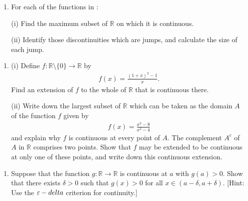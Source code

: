 \documentclass[letterpaper,10pt,english]{jupyterBook}
\begin{document}
\label{\detokenize{Problems:id17}}\begin{enumerate}
%
\setcounter{enumi}{16}
\item {} 
\sphinxAtStartPar
For each of the functions in {\hyperref[\detokenize{Problems:id7}]{}}:

\sphinxAtStartPar
(i) Find the maximum subset of \(\mathbb{R}\) on which it is continuous.

\sphinxAtStartPar
(ii) Identify those discontinuities which are jumps, and calculate the size of each jump.

\end{enumerate}
\label{\detokenize{Problems:id18}}\begin{enumerate}
%
\setcounter{enumi}{17}
\item {} 
\sphinxAtStartPar
(i) Define \(f:\mathbb{R} \setminus \{0\} \rightarrow \mathbb{R}\) by
\begin{equation*}
\begin{split}
    f(x) = \displaystyle\frac{(1 + x)^{2} - 1}{x}.
    \end{split}
\end{equation*}
\sphinxAtStartPar
Find an extension of \(f\) to the whole of \(\mathbb{R}\) that is continuous there.

\sphinxAtStartPar
(ii) Write down the largest subset of \(\mathbb{R}\) which can be taken as the domain \(A\) of the function \(f\) given by
\begin{equation*}
\begin{split}
    f(x) = \displaystyle\frac{x^{3}-8}{x^{2} - 4}
    \end{split}
\end{equation*}
\sphinxAtStartPar
and explain why \(f\) is continuous at every point of \(A\). The complement \(A^{c}\) of \(A\) in \(\mathbb{R}\) comprises two points. Show that \(f\) may be extended to be continuous at only one of these points, and write down this continuous extension.

\end{enumerate}
\label{\detokenize{Problems:id19}}\begin{enumerate}
%
\setcounter{enumi}{18}
\item {} 
\sphinxAtStartPar
{} Suppose that the function \(g: \mathbb{R} \rightarrow \mathbb{R}\) is continuous at \(a\) with \(g(a) > 0\). Show that there exists \(\delta > 0\) such that \(g(x) > 0\)  for all \( x \in (a - \delta, a + \delta)\). {[}Hint: Use the \(\varepsilon-\\delta\) criterion for continuity.{]}

\end{enumerate}
\end{document}
